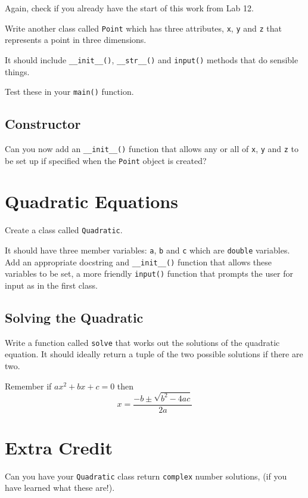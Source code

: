 \documentclass[12pt,oneside]{cttutorial}
\begin{document}
Again, check if you already have the start of this work from Lab 12.

Write another class called \lstinline!Point! which has three attributes, \lstinline!x!, \lstinline!y! and \lstinline!z! that represents a point in three dimensions.

It should include \lstinline!__init__()!, \lstinline!__str__()! and \lstinline!input()! methods that do sensible things.

Test these in your \lstinline!main()! function.

\subsection{Constructor}

Can you now add an \lstinline!__init__()! function that allows any or all of \lstinline!x!, \lstinline!y! and \lstinline!z! to be set up if specified when the \lstinline!Point! object is created?

\section{Quadratic Equations}
Create a class called \lstinline!Quadratic!.

It should have three member variables: \lstinline!a!, \lstinline!b! and \lstinline!c! which are \lstinline!double! variables. Add an appropriate docstring and \lstinline!__init__()! function that allows these variables to be set, a more friendly \lstinline!input()! function that prompts the user for input as in the first class.

\subsection{Solving the Quadratic}

Write a function called \lstinline!solve! that works out the solutions of the quadratic equation. It should ideally return a tuple of the two possible solutions if there are two.

Remember if $ax^2+bx+c = 0$ then
\[
x = \frac{-b \pm \sqrt{b^2 - 4ac}}{2a}
\]

\section{Extra Credit}

Can you have your \lstinline!Quadratic! class return \lstinline!complex! number solutions, (if you have learned what these are!).
\end{document}
